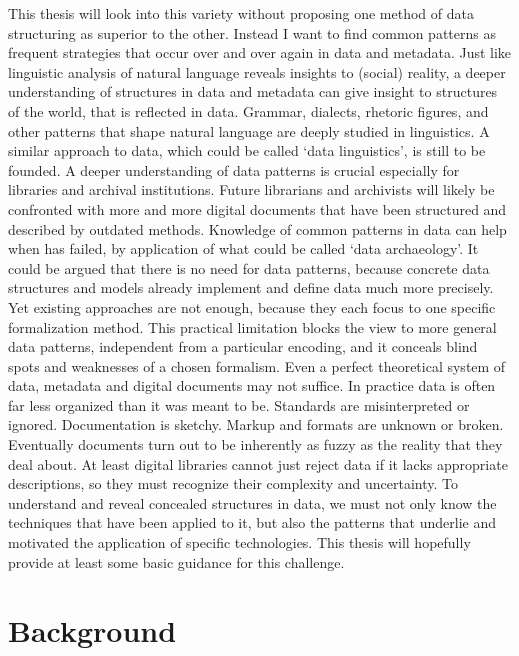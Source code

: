 This thesis will look into this variety without proposing one method of data
structuring as superior to the other. Instead I want to find common patterns as
frequent strategies that occur over and over again in data and metadata. Just
like linguistic analysis of natural language reveals insights to (social)
reality, a deeper understanding of structures in data and metadata can give
insight to structures of the world, that is reflected in data. Grammar,
dialects, rhetoric figures, and other patterns that shape natural language are
deeply studied in linguistics. A similar approach to data, which could be
called `data linguistics', is still to be founded. A deeper understanding of
data patterns is crucial especially for libraries and archival institutions.
Future librarians and archivists will likely be confronted with more and more
digital documents that have been structured and described by outdated methods.
Knowledge of common patterns in data can help when 
has failed, by application of what could be called `data archaeology'. It could
be argued that there is no need for data patterns, because concrete data
structures and models already implement and define data much more precisely.
Yet existing approaches are not enough, because they each focus to one specific
formalization method.  This practical limitation blocks the view to more
general data patterns, independent from a particular encoding, and it conceals
blind spots and weaknesses of a chosen formalism. Even a perfect theoretical
system of data, metadata and digital documents may not suffice. In practice
data is often far less organized than it was meant to be. Standards are
misinterpreted or ignored.  Documentation is sketchy. Markup and formats are
unknown or broken. Eventually documents turn out to be inherently as fuzzy as
the reality that they deal about.  At least digital libraries cannot just
reject data if it lacks appropriate descriptions, so they must recognize their
complexity and uncertainty. To understand and reveal concealed structures in
data, we must not only know the techniques that have been applied to it, but
also the patterns that underlie and motivated the application of specific
technologies. This thesis will hopefully provide at least some basic guidance
for this challenge.

\pagebreak
\section{Background}
\label{sec:background}


